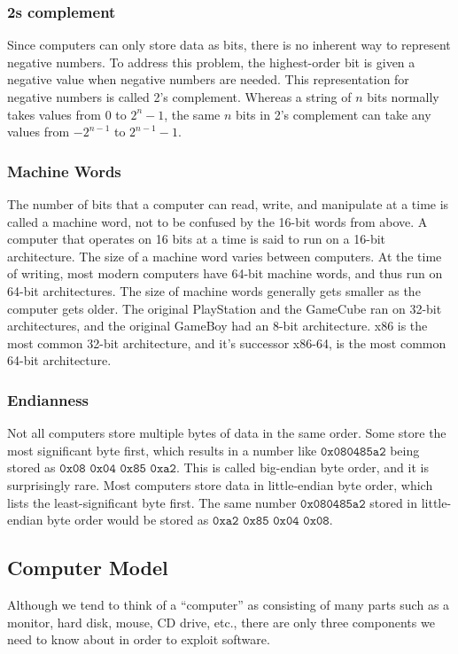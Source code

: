 \subsubsection{2s complement}
Since computers can only store data as bits, there is no inherent way to
represent negative numbers. To address this problem, the highest-order bit is
given a negative value when negative numbers are needed. This representation for
negative numbers is called 2's complement. Whereas a string of $n$ bits normally
takes values from $0$ to $2^n-1$, the same $n$ bits in 2's complement can take
any values from $-2^{n-1}$ to $2^{n-1}-1$.

\subsubsection{Machine Words}
The number of bits that a computer can read, write, and manipulate at a time is
called a machine word, not to be confused by the 16-bit words from above. A
computer that operates on 16 bits at a time is said to run on a 16-bit
architecture. The size of a machine word varies between computers. At the time
of writing, most modern computers have 64-bit machine words, and thus run on
64-bit architectures. The size of machine words generally gets smaller as the
computer gets older. The original PlayStation and the GameCube ran on 32-bit
architectures, and the original GameBoy had an 8-bit architecture. x86 is the
most common 32-bit architecture, and it's successor x86-64, is the most common
64-bit architecture.

\subsubsection{Endianness}
Not all computers store multiple bytes of data in the same order. Some store the
most significant byte first, which results in a number like
$\texttt{0x080485a2}$ being stored as $\texttt{0x08}$ $\texttt{0x04}$
$\texttt{0x85}$ $\texttt{0xa2}$. This is called big-endian byte order, and it is
surprisingly rare. Most computers store data in little-endian byte order, which
lists the least-significant byte first. The same number $\texttt{0x080485a2}$
stored in little-endian byte order would be stored as $\texttt{0xa2}$
$\texttt{0x85}$ $\texttt{0x04}$ $\texttt{0x08}$.

\subsection{Computer Model}
Although we tend to think of a ``computer'' as consisting of many parts such as a
monitor, hard disk, mouse, CD drive, etc., there are only three components we
need to know about in order to exploit software.

